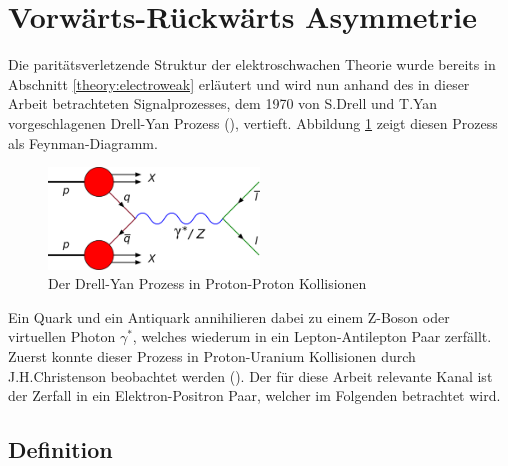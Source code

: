 \section{Vorwärts-Rückwärts Asymmetrie}
\label{theory:afb}


Die paritätsverletzende Struktur der elektroschwachen Theorie wurde bereits in
Abschnitt \ref{theory:electroweak} erläutert und wird nun anhand des in dieser
Arbeit betrachteten Signalprozesses, dem 1970 von S.Drell und T.Yan
vorgeschlagenen Drell-Yan Prozess (\cite{PhysRevLett.25.316}), vertieft.
Abbildung \ref{fig:drell_yan} zeigt diesen Prozess als Feynman-Diagramm.

\begin{figure}[h]
    \centering
    \includegraphics[width=0.5\textwidth]{img/drell_yan}
    \caption{Der Drell-Yan Prozess in Proton-Proton Kollisionen}
    \label{fig:drell_yan}
\end{figure}

Ein Quark und ein Antiquark annihilieren dabei zu einem Z-Boson oder virtuellen
Photon $\gamma^*$, welches wiederum in ein Lepton-Antilepton Paar zerfällt.
Zuerst konnte dieser Prozess in Proton-Uranium Kollisionen durch
J.H.Christenson beobachtet werden (\cite{PhysRevLett.25.1523}). Der für diese
Arbeit relevante Kanal ist der Zerfall in ein Elektron-Positron Paar, welcher
im Folgenden betrachtet wird.



\subsection{Definition}
\label{theory:afb_definition}


